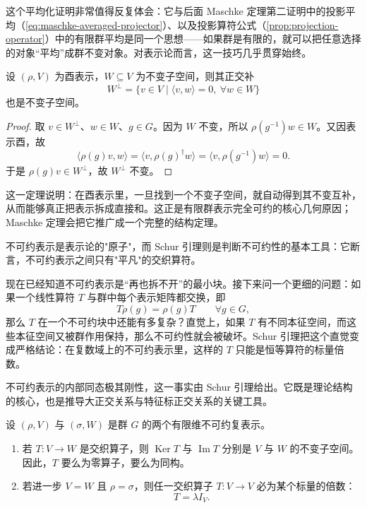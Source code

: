 这个平均化证明非常值得反复体会：它与后面 Maschke 定理第二证明中的投影平均（\cref{eq:maschke-averaged-projector}）、以及投影算符公式（\cref{prop:projection-operator}）中的有限群平均是同一个思想——如果群是有限的，就可以把任意选择的对象“平均”成群不变对象。对表示论而言，这一技巧几乎贯穿始终。

\begin{proposition}[酉表示的正交补不变]
设 $(\rho,V)$ 为酉表示，$W\subseteq V$ 为不变子空间，则其正交补
\[
W^{\perp}=\{v\in V\mid \langle v,w\rangle=0,\ \forall w\in W\}
\]
也是不变子空间。
\label{prop:orthogonal-complement-invariant}

\end{proposition}

\begin{proof}
取 $v\in W^{\perp}$、$w\in W$、$g\in G$。因为 $W$ 不变，所以 $\rho(g^{-1})w\in W$。又因表示酉，故
\[
\langle \rho(g)v,w\rangle
=\langle v,\rho(g)^{\dagger}w\rangle
=\langle v,\rho(g^{-1})w\rangle=0.
\]
于是 $\rho(g)v\in W^{\perp}$，故 $W^{\perp}$ 不变。
\end{proof}

这一定理说明：在酉表示里，一旦找到一个不变子空间，就自动得到其不变互补，从而能够真正把表示拆成直接和。这正是有限群表示完全可约的核心几何原因；Maschke 定理会把它推广成一个完整的结构定理。

不可约表示是表示论的"原子"，而 Schur 引理则是判断不可约性的基本工具：它断言，不可约表示之间只有"平凡"的交织算符。

现在已经知道不可约表示是“再也拆不开”的最小块。接下来问一个更细的问题：如果一个线性算符 $T$ 与群中每个表示矩阵都交换，即
\[
T\rho(g)=\rho(g)T\qquad\forall g\in G,
\]
那么 $T$ 在一个不可约块中还能有多复杂？直觉上，如果 $T$ 有不同本征空间，而这些本征空间又被群作用保持，那么不可约性就会被破坏。Schur 引理把这个直觉变成严格结论：在复数域上的不可约表示里，这样的 $T$ 只能是恒等算符的标量倍数。

不可约表示的内部同态极其刚性，这一事实由 Schur 引理给出。它既是理论结构的核心，也是推导大正交关系与特征标正交关系的关键工具。

\begin{theorem}[Schur 引理]
设 $(\rho,V)$ 与 $(\sigma,W)$ 是群 $G$ 的两个有限维不可约复表示。
\begin{enumerate}[label=(\roman*),leftmargin=3em]
  \item 若 $T:V\to W$ 是交织算子，则 $\operatorname{Ker} T$ 与 $\operatorname{Im} T$ 分别是 $V$ 与 $W$ 的不变子空间。因此，$T$ 要么为零算子，要么为同构。
  \item 若进一步 $V=W$ 且 $\rho=\sigma$，则任一交织算子 $T:V\to V$ 必为某个标量的倍数：
  \[
  T=\lambda I_V.
  \]
\end{enumerate}
\label{thm:schur-lemma}

\end{theorem}

